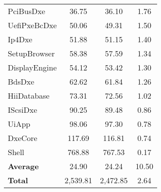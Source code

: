 \begin{longtable}{l c c c}
  PciBusDxe & 36.75 & 36.10 & 1.76\\
  UefiPxeBcDxe & 50.06 & 49.31 & 1.50\\
  Ip4Dxe & 51.88 & 51.15 & 1.40\\
  SetupBrowser & 58.38 & 57.59 & 1.34\\
  DisplayEngine & 54.12 & 53.42 & 1.30\\
  BdsDxe & 62.62 & 61.84 & 1.26\\
  HiiDatabase & 73.31 & 72.56 & 1.02\\
  IScsiDxe & 90.25 & 89.48 & 0.86\\
  UiApp & 98.06 & 97.30 & 0.78\\
  DxeCore & 117.69 & 116.81 & 0.74\\
  Shell & 768.88 & 767.53 & 0.17\\
  \midrule
  \textbf{Average} & 24.90 & 24.24 & 10.50\\
  \textbf{Total} & 2,539.81 & 2,472.85 & 2.64\\
  \bottomrule
\end{longtable}


